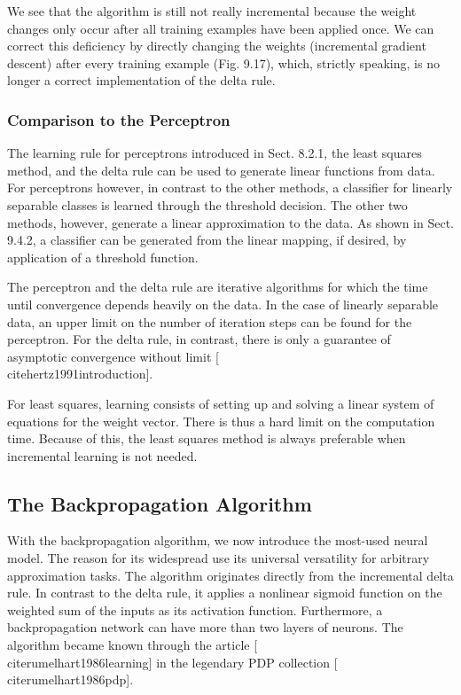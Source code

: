 \documentclass[10pt]{book}
\begin{document}
We see that the algorithm is still not really incremental because the weight changes only occur after all training examples have been applied once. We can correct this deficiency by directly changing the weights (incremental gradient descent) after every training example (Fig. 9.17), which, strictly speaking, is no longer a correct implementation of the delta rule.

\subsubsection*{Comparison to the Perceptron}
The learning rule for perceptrons introduced in Sect. 8.2.1, the least squares method, and the delta rule can be used to generate linear functions from data. For perceptrons however, in contrast to the other methods, a classifier for linearly separable classes is learned through the threshold decision. The other two methods, however, generate a linear approximation to the data. As shown in Sect. 9.4.2, a classifier can be generated from the linear mapping, if desired, by application of a threshold function.

The perceptron and the delta rule are iterative algorithms for which the time until convergence depends heavily on the data. In the case of linearly separable data, an upper limit on the number of iteration steps can be found for the perceptron. For the delta rule, in contrast, there is only a guarantee of asymptotic convergence without limit [\\cite{hertz1991introduction}].

For least squares, learning consists of setting up and solving a linear system of equations for the weight vector. There is thus a hard limit on the computation time. Because of this, the least squares method is always preferable when incremental learning is not needed.

\subsection*{The Backpropagation Algorithm}
With the backpropagation algorithm, we now introduce the most-used neural model. The reason for its widespread use its universal versatility for arbitrary approximation tasks. The algorithm originates directly from the incremental delta rule. In contrast to the delta rule, it applies a nonlinear sigmoid function on the weighted sum of the inputs as its activation function. Furthermore, a backpropagation network can have more than two layers of neurons. The algorithm became known through the article [\\cite{rumelhart1986learning}] in the legendary PDP collection [\\cite{rumelhart1986pdp}].
\end{document}
